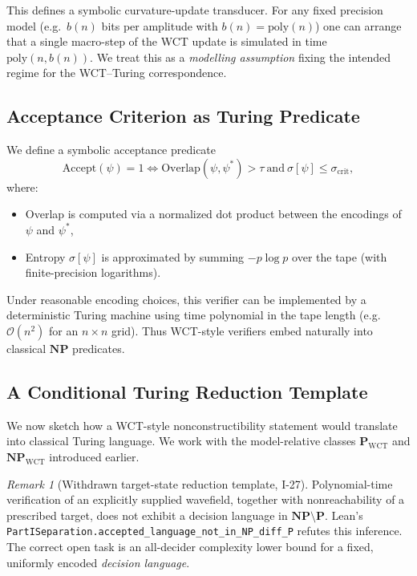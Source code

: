 \documentclass[12pt]{article}
\theoremstyle{remark}
\newtheorem*{remark}{Remark}
\begin{document}
This defines a symbolic curvature-update transducer.
For any fixed precision model (e.g.\ $b(n)$ bits per amplitude with $b(n)=\mathrm{poly}(n)$)
one can arrange that a single macro-step of the WCT update is simulated in time
$\mathrm{poly}(n,b(n))$.
We treat this as a \emph{modelling assumption} fixing the intended regime for
the WCT–Turing correspondence.

\subsection{Acceptance Criterion as Turing Predicate}

We define a symbolic acceptance predicate
\[
\text{Accept}(\psi) = 1 \iff \mathrm{Overlap}(\psi, \psi^*) > \tau \ \text{and}\ \sigma[\psi] \leq \sigma_{\text{crit}},
\]
where:
\begin{itemize}
  \item Overlap is computed via a normalized dot product between the encodings of \( \psi \) and \( \psi^* \),
  \item Entropy \( \sigma[\psi] \) is approximated by summing \( -p \log p \) over the tape (with finite-precision logarithms).
\end{itemize}

Under reasonable encoding choices, this verifier can be implemented by a deterministic
Turing machine using time polynomial in the tape length (e.g.\ \( \mathcal{O}(n^2) \)
for an \(n \times n\) grid).
Thus WCT-style verifiers embed naturally into classical $\mathbf{NP}$ predicates.

\subsection{A Conditional Turing Reduction Template}

We now sketch how a WCT-style nonconstructibility statement would translate into
classical Turing language.
We work with the model-relative classes
$\mathbf{P}_{\mathrm{WCT}}$ and $\mathbf{NP}_{\mathrm{WCT}}$
introduced earlier.

\begin{remark}[Withdrawn target-state reduction template, I-27]
Polynomial-time verification of an explicitly supplied
wavefield, together with nonreachability of a prescribed
target, does not exhibit a decision language in
$\mathbf{NP}\setminus\mathbf P$.
Lean's \nolinkurl{PartISeparation.accepted_language_not_in_NP_diff_P}
refutes this inference.  The correct open task is an
all-decider complexity lower bound for a fixed,
uniformly encoded \emph{decision language}.
\end{remark}
\end{document}
